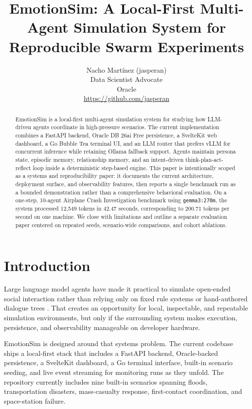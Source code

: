\documentclass{article}
\title{EmotionSim: A Local-First Multi-Agent Simulation System for Reproducible Swarm Experiments}
\author{
  Nacho Martínez (jasperan) \\
  Data Scientist Advocate \\
  Oracle \\
  \url{https://github.com/jasperan} \\
}
\begin{document}
\maketitle

\begin{abstract}
EmotionSim is a local-first multi-agent simulation system for studying how LLM-driven agents coordinate in high-pressure scenarios. The current implementation combines a FastAPI backend, Oracle DB 26ai Free persistence, a SvelteKit web dashboard, a Go Bubble Tea terminal UI, and an LLM router that prefers vLLM for concurrent inference while retaining Ollama fallback support. Agents maintain persona state, episodic memory, relationship memory, and an intent-driven think-plan-act-reflect loop inside a deterministic step-based engine. This paper is intentionally scoped as a systems and reproducibility paper: it documents the current architecture, deployment surface, and observability features, then reports a single benchmark run as a bounded demonstration rather than a comprehensive behavioral evaluation. On a one-step, 10-agent Airplane Crash Investigation benchmark using \texttt{gemma3:270m}, the system processed 12,549 tokens in 42.47 seconds, corresponding to 200.71 tokens per second on one machine. We close with limitations and outline a separate evaluation paper centered on repeated seeds, scenario-wide comparisons, and cohort ablations.
\end{abstract}


\section{Introduction}
Large language model agents have made it practical to simulate open-ended social interaction rather than relying only on fixed rule systems or hand-authored dialogue trees \cite{park2023generative, xi2023rise}. That creates an opportunity for local, inspectable, and repeatable simulation environments, but only if the surrounding system makes execution, persistence, and observability manageable on developer hardware.

EmotionSim is designed around that systems problem. The current codebase ships a local-first stack that includes a FastAPI backend, Oracle-backed persistence, a SvelteKit dashboard, a Go terminal interface, built-in scenario seeding, and live event streaming for monitoring runs as they unfold. The repository currently includes nine built-in scenarios spanning floods, transportation disasters, mass-casualty response, first-contact coordination, and space-station failure.
\end{document}
